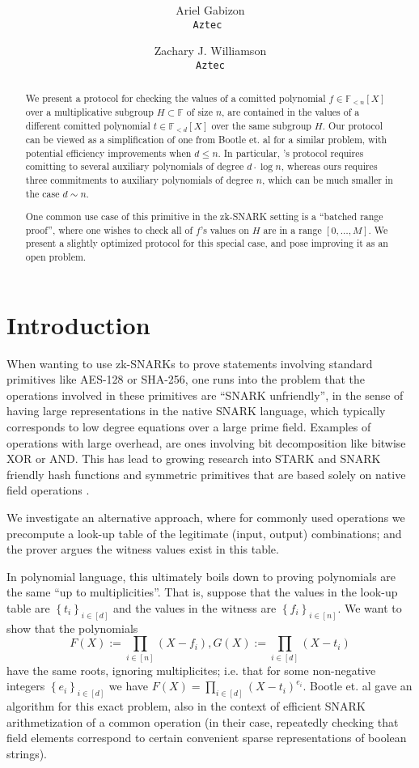 \documentclass[11pt]{article} %
\title{ \bf \papertitle \\[0.72cm]}
\author{ Ariel Gabizon\\ \tt{Aztec}  \and Zachary J. Williamson\\ \tt{Aztec}}
\newcommand{\F}{\ensuremath{\mathbb F}\xspace}
\newcommand{\defeq}{:=}
\newcommand{\sett}[2]{\ensuremath{\set{#1}_{#2}}\xspace}
\newcommand{\set}[1]{\ensuremath{\left\{#1\right\}}\xspace}
\newcommand{\polysofdeg}[1]{\ensuremath{\F_{< #1}[X]}\xspace}
\begin{document}
    \maketitle

    
    \begin{abstract}
     We present a protocol for checking the values of a comitted polynomial $f\in \polysofdeg{n}$ over a multiplicative subgroup $H\subset \F$ of size $n$, are contained in the values of a different comitted polynomial $t\in \polysofdeg{d}$ over the same subgroup $H$. Our protocol can be viewed as a simplification of one from Bootle et. al \cite{arya} for a similar problem, with potential efficiency improvements when $d\leq n$. In particular, \cite{arya}'s protocol requires comitting to several auxiliary polynomials of degree $d\cdot \log n$, whereas ours requires three commitments to auxiliary polynomials of degree $n$, which can be much smaller in the case $d\sim n$.
     
     One common use case of this primitive in the zk-SNARK setting is a ``batched range proof'', where one wishes to check all of $f$'s values on $H$ are in a range $[0,\ldots,M]$. We present a slightly optimized protocol for this special case, and pose improving it as an open problem.
    \end{abstract}


\section{Introduction}
When wanting to use zk-SNARKs to prove statements involving standard primitives like AES-128 or SHA-256, one runs into the problem that the operations involved in these primitives are ``SNARK unfriendly'', in the sense of having large representations in the native SNARK language, which typically corresponds to low degree equations over a large prime field.
Examples of operations with large overhead, are ones involving bit decomposition like bitwise XOR or AND. This has lead to growing research into STARK and SNARK friendly hash functions and symmetric primitives that are based solely on native field operations \cite{poseidon,marvelous,mimc,mimc2}.


We investigate an alternative approach, where for commonly used operations we precompute a look-up table of the legitimate (input, output) combinations; and the prover argues the witness values exist in this table.

In polynomial language, this ultimately boils down to proving polynomials are the same ``up to multiplicities''.
That is, suppose that the values in the look-up table are \sett{t_i}{i\in [d]} and the values in the witness are \sett{f_i}{i\in [n]}. We want to show that the polynomials
\[F(X)\defeq \prod_{i\in [n]} (X-f_i), G(X)\defeq \prod_{i\in [d]}(X-t_i)\]
have the same roots, ignoring multiplicites; i.e. that for some non-negative integers \sett{e_i}{i\in [d]} we  have
$F(X) = \prod_{i\in [d]} (X-t_i)^{e_i}$.
Bootle et. al \cite{arya} gave an algorithm for this exact problem, also in the context of efficient SNARK arithmetization of a common operation (in their case, repeatedly checking that field elements correspond to certain convenient sparse representations of boolean strings).
\end{document}

